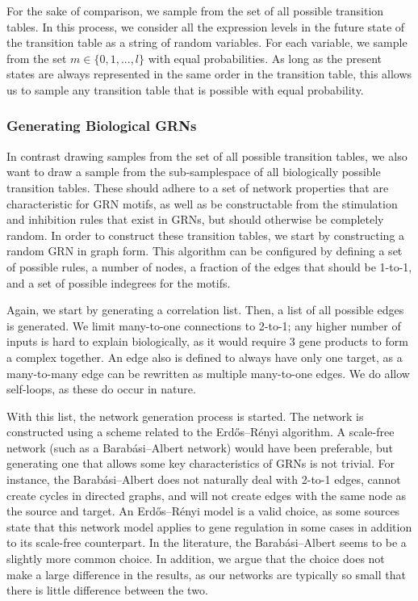 \documentclass[../main.tex]{subfiles}
\begin{document}
For the sake of comparison, we sample from the set of all possible transition tables.
In this process, we consider all the expression levels in the future state of the transition table as a string of random variables.
For each variable, we sample from the set $m \in \{0, 1, ..., l\}$ with equal probabilities.
As long as the present states are always represented in the same order in the transition table, this allows us to sample any transition table that is possible with equal probability.

\subsubsection{Generating Biological GRNs}

In contrast drawing samples from the set of all possible transition tables, we also want to draw a sample from the sub-samplespace of all biologically possible transition tables.
These should adhere to a set of network properties that are characteristic for GRN motifs, as well as be constructable from the stimulation and inhibition rules that exist in GRNs, but should otherwise be completely random.
In order to construct these transition tables, we start by constructing a random GRN in graph form.
This algorithm can be configured by defining a set of possible rules, a number of nodes, a fraction of the edges that should be 1-to-1, and a set of possible indegrees for the motifs.

Again, we start by generating a correlation list.
Then, a list of all possible edges is generated.
We limit many-to-one connections to 2-to-1; any higher number of inputs is hard to explain biologically, as it would require 3 gene products to form a complex together.
An edge also is defined to always have only one target, as a many-to-many edge can be rewritten as multiple many-to-one edges.
We do allow self-loops, as these do occur in nature.

With this list, the network generation process is started.
The network is constructed using a scheme related to the Erdős–Rényi algorithm.
A scale-free network (such as a Barabási–Albert network) would have been preferable, but generating one that allows some key characteristics of GRNs is not trivial.
For instance, the Barabási–Albert does not naturally deal with 2-to-1 edges, cannot create cycles in directed graphs, and will not create edges with the same node as the source and target.
An Erdős–Rényi model is a valid choice, as some sources state that this network model applies to gene regulation in some cases in addition to its scale-free counterpart.
In the literature, the Barabási–Albert seems to be a slightly more common choice.
In addition, we argue that the choice does not make a large difference in the results, as our networks are typically so small that there is little difference between the two.
\end{document}

